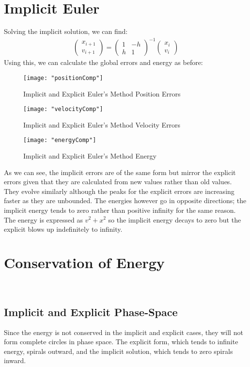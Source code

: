 \documentclass{article}
\begin{document}
\section{Implicit Euler}
Solving the implicit solution, we can find:
\begin{align*}
	\begin{pmatrix}
		x_{i + 1} \\
		v_{i + 1}
	\end{pmatrix}
	=
	\begin{pmatrix}
		1 & -h \\
		h & 1
	\end{pmatrix} ^{-1}
	\begin{pmatrix}
		x_{i} \\
		v_{i}
	\end{pmatrix}
\end{align*}
Using this, we can calculate the global errors and energy as before:
\begin{figure}[h!]
	\centering
	\texttt{[image: "positionComp"]}
	\caption{Implicit and Explicit Euler's Method Position Errors}
\end{figure} 
\begin{figure}[h!]
	\centering
	\texttt{[image: "velocityComp"]}
	\caption{Implicit and Explicit Euler's Method Velocity Errors}
\end{figure} 
\begin{figure}[h!]
	\centering
	\texttt{[image: "energyComp"]}
	\caption{Implicit and Explicit Euler's Method Energy}
\end{figure} 
\FloatBarrier
As we can see, the implicit errors are of the same form but mirror the explicit errors given that they are calculated from new values rather
than old values. They evolve similarly although the peaks for the explicit errors are increasing faster as they are unbounded. The energies
however go in opposite directions; the implicit energy tends to zero rather than positive infinity for the same reason. The energy is expressed as 
$v^2 + x^2$ so the implicit energy decays to zero but the explicit blows up indefinitely to infinity.


\section{Conservation of Energy}\ 
\subsection{Implicit and Explicit Phase-Space}
Since the energy is not conserved in the implicit and explicit cases, they will not form complete circles in phase space. The explicit
form, which tends to infinite energy, spirals outward, and the implicit solution, which tends to zero spirals inward.
\end{document}
